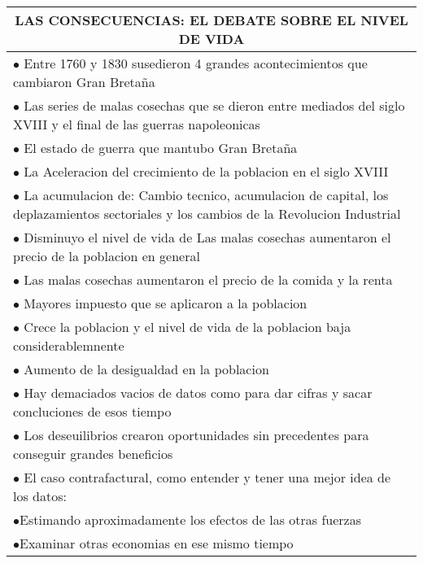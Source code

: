 \begingroup
\setlength{\tabcolsep}{12pt} %
\renewcommand{\arraystretch}{1.5} %
\begin{tabular}{p{15cm}}
\multicolumn{1}{c}{\large LAS CONSECUENCIAS: EL DEBATE SOBRE EL NIVEL DE VIDA} \\ \hline
$\bullet$ Entre 1760 y 1830 susedieron 4 grandes acontecimientos que cambiaron Gran Bretaña \\
\hspace{1cm} $\bullet$ Las series de malas cosechas que se dieron entre mediados del siglo XVIII y el final de las guerras napoleonicas\\
\hspace{1cm} $\bullet$ El estado de guerra que mantubo Gran Bretaña\\
\hspace{1cm} $\bullet$ La Aceleracion del crecimiento de la poblacion en el siglo XVIII\\
\hspace{1cm} $\bullet$ La acumulacion de: Cambio tecnico, acumulacion de capital, los deplazamientos sectoriales y los cambios de la Revolucion Industrial\\
$\bullet$ Disminuyo el nivel de vida de Las malas cosechas aumentaron el precio de la poblacion en general\\
$\bullet$ Las malas cosechas aumentaron el precio de la comida y la renta\\
$\bullet$ Mayores impuesto que se aplicaron a la poblacion\\
$\bullet$ Crece la poblacion y el nivel de vida de la poblacion baja considerablemnente\\
$\bullet$ Aumento de la desigualdad en la poblacion\\
$\bullet$ Hay demaciados vacios de datos como para dar cifras y sacar concluciones de esos tiempo\\
$\bullet$ Los deseuilibrios crearon oportunidades sin precedentes para conseguir grandes beneficios\\
$\bullet$ El caso contrafactural, como entender y tener una mejor idea de los datos:\\
\hspace{1cm} $\bullet$Estimando aproximadamente los efectos de las otras fuerzas\\
\hspace{1cm} $\bullet$Examinar otras economias en ese mismo tiempo\\
\end{tabular}
\endgroup

